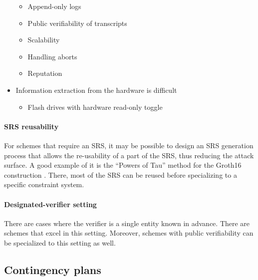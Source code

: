 \begin{itemize}
\begin{itemize}
    \item Append-only logs
    \item Public verifiability of transcripts
    \item Scalability
    \item Handling aborts
    \item Reputation
	\end{itemize}
    \item Information extraction from the hardware is difficult
	\begin{itemize}
        \item Flash drives with hardware read-only toggle
	\end{itemize}
\end{itemize}



\paragraph{SRS reusability}
For schemes that require an SRS, it may be possible to design an SRS generation process that allows the re-usability of a part of the SRS, thus reducing the attack surface. 
A good example of it is the ``Powers of Tau'' method \cite{2017:BGM:eprint:scalable-MPC-for-zk-SNARK-parameters-in-random-beacon-model} for the Groth16 construction \cite{2016:Eurocrypt:On-the-Size-of-Pairing-Based-Non-interactive-Arguments}.
There, most of the SRS can be reused before specializing to a specific constraint system.


\paragraph{Designated-verifier setting}
There are cases where the verifier is a single entity known in advance.
There are schemes that excel in this setting. 
Moreover, schemes with public verifiability can be specialized to this setting as well.


\subsection{Contingency plans}
\label{implem:correctness:contingency}

